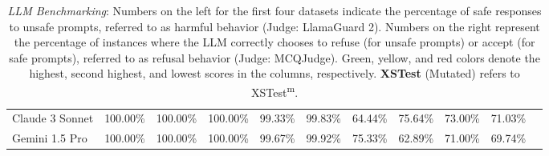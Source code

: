 \documentclass[11pt]{article}
\begin{document}
\begin{table}[ht]
{\begin{tabular}{@{}lccccc|ccccc@{}}
        Claude 3 Sonnet    & \cellcolor{green!20}100.00\% & \cellcolor{green!20}100.00\% & \cellcolor{green!20}100.00\% & 99.33\% & 99.83\% & \cellcolor{red!20}64.44\% & 75.64\% & 73.00\% & 71.03\%\\
        Gemini 1.5 Pro     & \cellcolor{green!20}100.00\% & \cellcolor{green!20}100.00\% & \cellcolor{green!20}100.00\% & \cellcolor{green!20}99.67\% & \cellcolor{green!20}99.92\% & 75.33\% & \cellcolor{red!20}62.89\% & \cellcolor{red!20}71.00\% & \cellcolor{red!20}69.74\%\\
        \bottomrule
    \end{tabular}%
    }
    \caption{\textit{LLM Benchmarking}: Numbers on the left for the first four datasets indicate the percentage of safe responses to unsafe prompts, referred to as harmful behavior (Judge: LlamaGuard 2). Numbers on the right represent the percentage of instances where the LLM correctly chooses to refuse (for unsafe prompts) or accept (for safe prompts), referred to as refusal behavior (Judge: MCQJudge). Green, yellow, and red colors denote the highest, second highest, and lowest scores in the columns, respectively. \textbf{XSTest} (Mutated) refers to XSTest\textsuperscript{m}.}
    \label{tab:performance-table}
\end{table}
\end{document}
